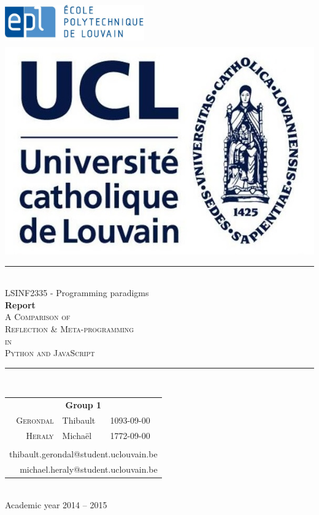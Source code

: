 \documentclass[a4paper,10pt]{article}
\begin{document}

\begin{titlepage}
\newcommand{\HRule}{\rule{\linewidth}{0.5mm}}
\includegraphics[width=6cm,height=1.9cm]{images/Logo_EPL.jpg}
\hfill
\includegraphics[width=3.3 cm,height=2.2 cm]{images/ucl.jpg}

\centering %

\null
\vspace{4 cm}


\HRule \\[0.9cm]

{ {\LARGE LSINF2335 - Programming paradigms}\\[0.4cm]

\huge \textbf{Report} \\[0.6 cm]
{\LARGE \textsc{A Comparison of \\ Reflection \& Meta-programming \\
in \\
Python and JavaScript} }}
\\[0.9cm]
\HRule \\[2cm]

\Large {

\begin{tabular}{rll}
\multicolumn{3}{c}{\textbf{Group 1}}  \\ [0.3 cm]
\hspace{2mm} \textsc{Gerondal} & Thibault & 1093-09-00 \\
\hspace{2mm} \textsc{Heraly } & Michaël & 1772-09-00 \\
\\
\multicolumn{3}{r}{thibault.gerondal@student.uclouvain.be} \\
\multicolumn{3}{r}{michael.heraly@student.uclouvain.be} \\
\end{tabular}}
\\[1.5cm]



\large{Academic year 2014 -- 2015} %

\end{titlepage}
\end{document}
